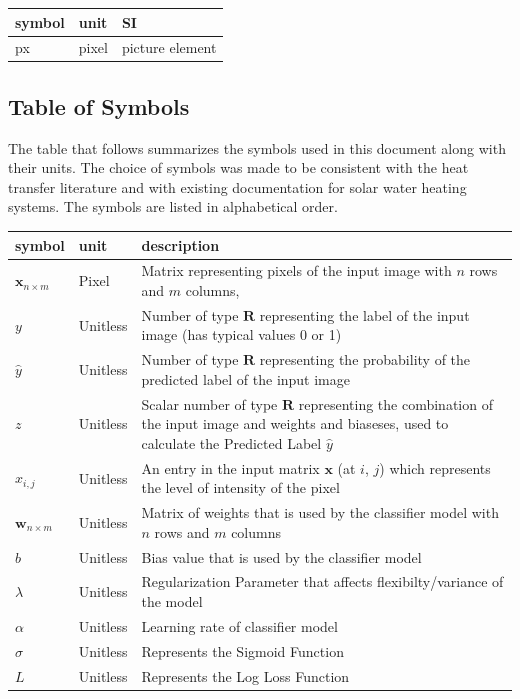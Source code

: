 \documentclass[12pt]{article}
\begin{document}
\renewcommand{\arraystretch}{1.2}
  \noindent \begin{tabular}{l l l} 
    \toprule		
    \textbf{symbol} & \textbf{unit} & \textbf{SI}\\
    \midrule 
    px & pixel & picture element\\
  \end{tabular}

\subsection{Table of Symbols}

The table that follows summarizes the symbols used in this document along with
their units.  The choice of symbols was made to be consistent with the heat
transfer literature and with existing documentation for solar water heating
systems.  The symbols are listed in alphabetical order.

\renewcommand{\arraystretch}{1.2}
\noindent \begin{longtable*}{l l p{12cm}} \toprule
\textbf{symbol} & \textbf{unit} & \textbf{description}\\
\midrule 
$\mathbf{x}_{n \times m}$ & Pixel & Matrix representing pixels of the input image with $n$ rows and $m$ columns, 
\\
$y$ & Unitless & Number of type $\mathbf{R}$ representing the label of the input image (has typical values 0 or 1)
\\
$\hat{y}$ & Unitless & Number of type $\mathbf{R}$ representing the probability of the predicted label of the input image
\\
$z$ & Unitless & Scalar number of type $\mathbf{R}$ representing the combination of the input image and weights and biaseses, used to calculate the Predicted Label $\hat{y}$
\\
$x_{i,j}$ & Unitless & An entry in the input matrix $\mathbf{x}$ (at $i$, $j$) which represents the level of intensity of the pixel
\\
$\mathbf{w}_{n \times m}$ & Unitless & Matrix of weights that is used by the classifier model with $n$ rows and $m$ columns
\\
$b$ & Unitless & Bias value that is used by the classifier model
\\
$\lambda$ & Unitless & Regularization Parameter that affects flexibilty/variance of the model
\\
$\alpha$ & Unitless & Learning rate of classifier model
\\
$\sigma$ & Unitless & Represents the Sigmoid Function
\\
$L$ & Unitless & Represents the Log Loss Function
\\
\bottomrule
\end{longtable*}
\end{document}
